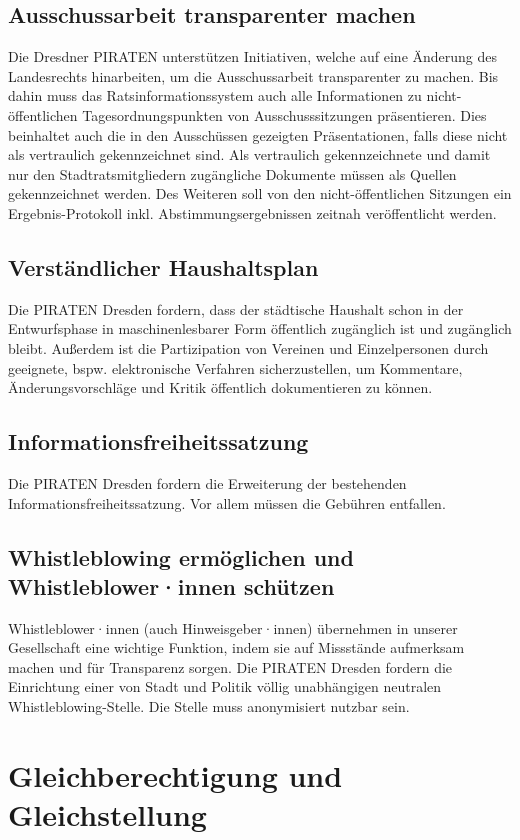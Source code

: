\documentclass[a4paper, 11pt]{article}
\begin{document}
\subsection{Ausschussarbeit transparenter machen}
Die Dresdner PIRATEN unterstützen Initiativen, welche auf eine Änderung des Landesrechts hinarbeiten, um die Ausschussarbeit transparenter zu machen. Bis dahin muss das Ratsinformationssystem auch alle Informationen zu nicht-öffentlichen Tagesordnungspunkten von Ausschusssitzungen präsentieren. Dies beinhaltet auch die in den Ausschüssen gezeigten Präsentationen, falls diese nicht als vertraulich gekennzeichnet sind. Als vertraulich gekennzeichnete und damit nur den Stadtratsmitgliedern zugängliche Dokumente müssen als Quellen gekennzeichnet werden. Des Weiteren soll von den nicht-öffentlichen Sitzungen ein Ergebnis-Protokoll inkl. Abstimmungsergebnissen zeitnah veröffentlicht werden.


\subsection{Verständlicher Haushaltsplan}
Die PIRATEN Dresden fordern, dass der städtische Haushalt schon in der Entwurfsphase in maschinenlesbarer Form öffentlich zugänglich ist und zugänglich bleibt. Außerdem ist die Partizipation von Vereinen und Einzelpersonen durch geeignete, bspw. elektronische Verfahren sicherzustellen, um Kommentare, Änderungsvorschläge und Kritik öffentlich dokumentieren zu können.


\subsection{Informationsfreiheitssatzung}
Die PIRATEN Dresden fordern die Erweiterung der bestehenden Informationsfreiheitssatzung. Vor allem müssen die Gebühren entfallen.


\subsection{Whistleblowing ermöglichen und Whistleblower·innen schützen}
Whistleblower·innen (auch Hinweisgeber·innen) übernehmen in unserer Gesellschaft eine wichtige Funktion, indem sie auf Missstände aufmerksam machen und für Transparenz sorgen. Die PIRATEN Dresden fordern die Einrichtung einer von Stadt und Politik völlig unabhängigen neutralen Whistleblowing-Stelle. Die Stelle muss anonymisiert nutzbar sein.


\section{Gleichberechtigung und Gleichstellung}
\end{document}

